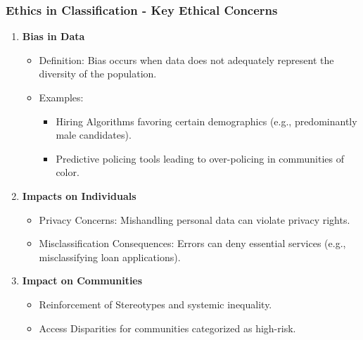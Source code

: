 \documentclass{beamer}
\begin{document}
\begin{frame}[fragile]
    \frametitle{Ethics in Classification - Key Ethical Concerns}
    \begin{enumerate}
        \item \textbf{Bias in Data}
        \begin{itemize}
            \item Definition: Bias occurs when data does not adequately represent the diversity of the population.
            \item Examples: 
            \begin{itemize}
                \item Hiring Algorithms favoring certain demographics (e.g., predominantly male candidates).
                \item Predictive policing tools leading to over-policing in communities of color.
            \end{itemize}
        \end{itemize}
        
        \item \textbf{Impacts on Individuals}
        \begin{itemize}
            \item Privacy Concerns: Mishandling personal data can violate privacy rights.
            \item Misclassification Consequences: Errors can deny essential services (e.g., misclassifying loan applications).
        \end{itemize}

        \item \textbf{Impact on Communities}
        \begin{itemize}
            \item Reinforcement of Stereotypes and systemic inequality.
            \item Access Disparities for communities categorized as high-risk.
        \end{itemize}
    \end{enumerate}
\end{frame}
\end{document}
